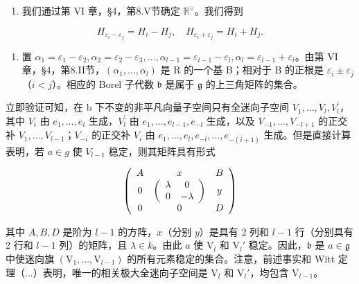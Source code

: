 \begin{enumerate}
\def\labelenumi{(\Roman{enumi})}
\setcounter{enumi}{1}
\tightlist
\item
我们通过第 VI 章，§4，第8.V节确定 \(\mathbb{R}^{\vee}\)。我们得到
\end{enumerate}

\[
H _ {\varepsilon_ {i} - \varepsilon_ {j}} = H _ {i} - H _ {j}, \quad H _ {\varepsilon_ {i} + \varepsilon_ {j}} = H _ {i} + H _ {j}.
\]

\begin{enumerate}
\def\labelenumi{(\Roman{enumi})}
\setcounter{enumi}{2}
\tightlist
\item
置 \(\alpha_{1} = \varepsilon_{1} - \varepsilon_{2},\alpha_{2} = \varepsilon_{2} - \varepsilon_{3},\ldots ,\alpha_{l - 1} = \varepsilon_{l - 1} - \varepsilon_{l},\alpha_{l} = \varepsilon_{l - 1} + \varepsilon_{l}\)。由第 VI 章，§4，第8.II节，\((\alpha_{1},\dots,\alpha_{l})\) 是 R 的一个基 B；相对于 B 的正根是 \(\varepsilon_i\pm \varepsilon_j\)（\(i < j\)）。相应的 Borel 子代数 \(\mathfrak{b}\) 是属于 \(\mathfrak{g}\) 的上三角矩阵的集合。
\end{enumerate}

立即验证可知，在 b 下不变的非平凡向量子空间只有全迷向子空间 \(V_{1},\ldots,V_{l},V_{l}^{\prime}\)，其中 \(V_{i}\) 由 \(e_{1},\ldots,e_{i}\) 生成，\(V_{l}^{\prime}\) 由 \(e_{1},\ldots,e_{l-1},e_{-l}\) 生成，以及 \(V_{-1},\ldots,V_{-l+1}\) 的正交补 \(V_{1},\ldots,V_{l-1}\)；\(V_{-i}\) 的正交补 \(V_{i}\) 由 \(e_{1},\ldots,e_{l},e_{-l},\ldots,e_{-(i+1)}\) 生成。但是直接计算表明，若 \(a\in g\) 使 \(V_{l-1}\) 稳定，则其矩阵具有形式

\[
\left( \begin{array}{c c c} A & x & B \\ 0 & \left( \begin{array}{c c} \lambda & 0 \\ 0 & - \lambda \end{array} \right) & y \\ 0 & 0 & D \end{array} \right)
\]

其中 \(A, B, D\) 是阶为 \(l - 1\) 的方阵，\(x\)（分别 \(y\)）是具有 2 列和 \(l - 1\) 行（分别具有 2 行和 \(l - 1\) 列）的矩阵，且 \(\lambda \in k\)。由此 \(a\) 使 \(\mathrm{V}_l\) 和 \(\mathrm{V}_l'\) 稳定。因此，\(\mathfrak{b}\) 是 \(a \in \mathfrak{g}\) 中使迷向旗 \((\mathrm{V}_1, \ldots, \mathrm{V}_{l-1})\) 的所有元素稳定的集合。注意，前述事实和 Witt 定理（...）表明，唯一的相关极大全迷向子空间是 \(\mathrm{V}_l\) 和 \(\mathrm{V}_l'\)，均包含 \(\mathrm{V}_{l-1}\)。


